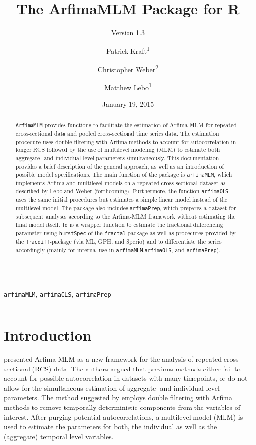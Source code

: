 \documentclass[12pt]{paper}\usepackage[]{graphicx}\usepackage[]{color}
\author{Patrick Kraft\textsuperscript{1} \and
Christopher Weber\textsuperscript{2} \and
Matthew Lebo\textsuperscript{1}}
\title{The ArfimaMLM Package for R}
\subtitle{Version 1.3}
\date{January 19, 2015}
\begin{document}
\pagestyle{fancy}

\fancyfoot[C]{\thepage} %

\maketitle

\hrule
\begin{abstract}
\texttt{ArfimaMLM} provides functions to facilitate the estimation of Arfima-MLM for repeated cross-sectional data and pooled cross-sectional time series data. The estimation procedure uses double filtering with Arfima methods to account for autocorrelation in longer RCS followed by the use of multilevel modeling (MLM) to estimate both aggregate- and individual-level parameters simultaneously. This documentation provides a brief description of the general approach, as well as an  introduction of possible model specifications. The main function of the package is \texttt{arfimaMLM}, which implements Arfima and multilevel models on a repeated cross-sectional dataset as described by Lebo and Weber (forthcoming). Furthermore, the function \texttt{arfimaOLS} uses the same initial procedures but estimates a simple linear model instead of the multilevel model. The package also includes \texttt{arfimaPrep}, which prepares a dataset for subsequent analyses according to the Arfima-MLM framework without estimating the final model itself. \texttt{fd} is a wrapper function to estimate the fractional differencing parameter using \texttt{hurstSpec} of the \texttt{fractal}-package as well as procedures provided by the \texttt{fracdiff}-package (via ML, GPH, and Sperio) and to differentiate the series accordingly (mainly for internal use in \texttt{arfimaMLM},\texttt{arfimaOLS}, and \texttt{arfimaPrep}).
\end{abstract}

\begin{keywords}
\texttt{arfimaMLM}, \texttt{arfimaOLS}, \texttt{arfimaPrep}
\end{keywords}
\hrule

\vfill
\newpage


\section{Introduction}

\citet{lebo2015effective} presented Arfima-MLM as a new framework for the analysis of repeated cross-sectional (RCS) data. The authors argued that previous methods either fail to account for possible autocorrelation in datasets with many timepoints, or do not allow for the simultaneous estimation of aggregate- and individual-level parameters. The method suggested by \citet{lebo2015effective} employs double filtering with Arfima methods to remove temporally deterministic components from the variables of interest. After purging potential autocorrelations, a multilevel model (MLM) is used to estimate the parameters for both, the individual as well as the (aggregate) temporal level variables.
\end{document}
